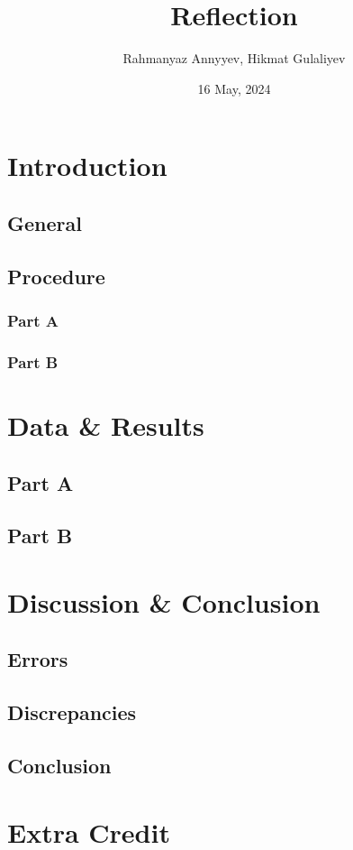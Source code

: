 \documentclass[10pt]{article}
\title{Reflection}
\author{Rahmanyaz Annyyev, Hikmat Gulaliyev}
\date{16 May, 2024}
\begin{document}
\maketitle

\begin{abstract}

\end{abstract}

\section{Introduction}

\subsection*{General}

\subsection*{Procedure} 

\subsubsection*{Part A}

\subsubsection*{Part B}

\section{Data \& Results}

\subsection*{Part A}

\subsection*{Part B}

\section{Discussion \& Conclusion}

\subsection*{Errors}

\subsection*{Discrepancies}

\subsection*{Conclusion} 

\section{Extra Credit}

\printbibliography
\end{document}
